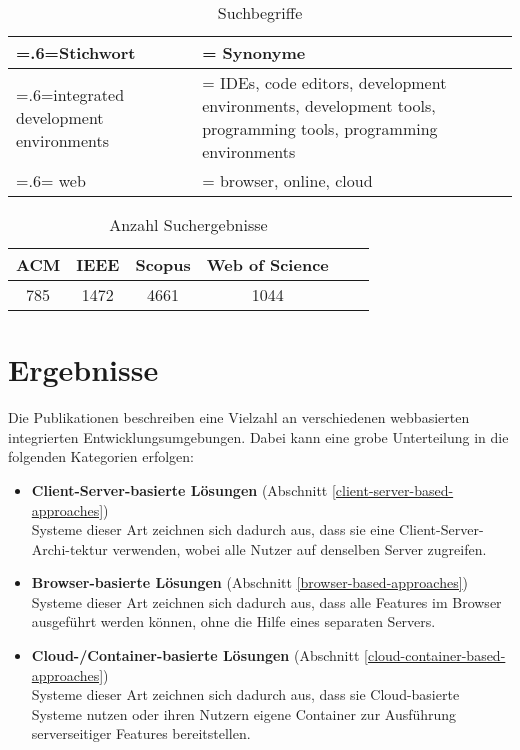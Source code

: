 \begin{table}[tbp]
    \centering
    \begin{tabularx}{\textwidth}{| >{\hsize=.6\hsize\linewidth=\hsize}X |
            >{\hsize=1.4\hsize\linewidth=\hsize}X |}
        \hline
        Stichwort                           & Synonyme                                                                                                     \\
        \hline
        integrated development environments & IDEs, code editors, development environments, development tools, programming tools, programming environments \\
        \hline
        web                                 & browser, online, cloud                                                                                       \\
        \hline
    \end{tabularx}
    \caption{Suchbegriffe}
    \label{table:search-terms}
\end{table}


\begin{table}[tbp]
    \centering
    \begin{tabular}{|c|c|c|c|c|c|}
        \hline
        ACM & IEEE & Scopus & Web of Science \\
        \hline
        785 & 1472 & 4661   & 1044           \\
        \hline
    \end{tabular}
    \caption{Anzahl Suchergebnisse}
    \label{table:amount-search-results}
\end{table}

\section{Ergebnisse}

Die Publikationen beschreiben eine Vielzahl an verschiedenen webbasierten integrierten Entwicklungsumgebungen. Dabei kann eine grobe Unterteilung in die folgenden Kategorien erfolgen:

\begin{itemize}
    \item \textbf{Client-Server-basierte Lösungen} \hfill (Abschnitt \ref{client-server-based-approaches}) \\
          Systeme dieser Art zeichnen sich dadurch aus, dass sie eine Client-Server-Archi-tektur verwenden, wobei alle Nutzer auf denselben Server zugreifen.
    \item \textbf{Browser-basierte Lösungen} \hfill (Abschnitt \ref{browser-based-approaches}) \\
          Systeme dieser Art zeichnen sich dadurch aus, dass alle Features im Browser ausgeführt werden können, ohne die Hilfe eines separaten Servers.
    \item \textbf{Cloud-/Container-basierte Lösungen} \hfill (Abschnitt \ref{cloud-container-based-approaches}) \\
          Systeme dieser Art zeichnen sich dadurch aus, dass sie Cloud-basierte Systeme nutzen oder ihren Nutzern eigene Container zur Ausführung serverseitiger Features bereitstellen.
\end{itemize}

